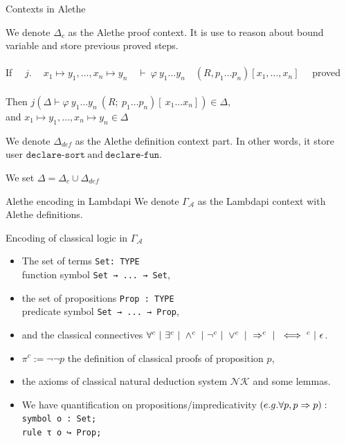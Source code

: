 \documentclass[aspectratio=169,xcolor={dvipsnames}]{beamer}
\begin{document}
\AtBeginSection[]
{
  \begin{frame}
    \tableofcontents[currentsection]
  \end{frame}
}


\begin{frame}{Contexts in Alethe}
\begin{definition}
We denote $\Delta_c$ as the Alethe proof context.
It is use to reason about bound variable and store previous proved steps.\\\\
If $\quad j.\quad ~ x_1 \mapsto y_1, \dots , x_n \mapsto y_n \quad \vdash~ \varphi~y_1 \dots y_n \quad (R, p_1 \dots p_n)[x_1, \dots, x_n]\quad$ proved\\\\
Then $j(\Delta \vdash \varphi~y_1 \dots y_n~(R;~p_1 \dots p_n)[~x_1 \dots x_n]) \in \Delta$, \\
and $x_1 \mapsto y_1, \dots , x_n \mapsto y_n \in \Delta$
\end{definition}
\vfill
\begin{definition}
We denote $\Delta_{def}$ as the Alethe definition context part. In other words,
it store user $\texttt{declare-sort}~\text{and}~\texttt{declare-fun}$.
\end{definition}
\begin{definition} We set $\Delta = \Delta_c \cup \Delta_{def}$ \end{definition}
\end{frame}

\begin{frame}[t, fragile]{Alethe encoding in Lambdapi}
We denote $\Gamma_\mathcal{A}$ as the Lambdapi context with Alethe definitions.
\begin{block}{Encoding of classical logic in $\Gamma_\mathcal{A}$ \footnotemark[1]}
\begin{itemize}
\item The set of terms \lstinline{Set: TYPE}\\
    function symbol \lstinline{Set → ... → Set},
\item the set of propositions \lstinline{Prop : TYPE}\\
    predicate symbol \lstinline{Set → ... → Prop},
\item and the classical connectives $\forall^c ~|~ \exists^c ~|~ \land^c ~|~ \neg^c ~|~ \lor^c ~|~ \Rightarrow^c ~|~ \iff^c ~|~ \epsilon$.
\item $\pi^c := \neg \neg p$ the definition of classical proofs of proposition $p$,
\item the axioms of classical natural deduction system $\mathcal{NK}$ and some lemmas.
\item We have quantification on propositions/impredicativity $(e.g. \forall p, p \Rightarrow p):$\\
\lstinline{symbol o : Set;}\\
\lstinline{rule τ o ↪ Prop;}
\end{itemize}
\end{block}
\end{frame}
\end{document}
